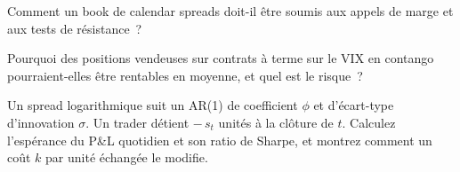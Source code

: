 \begin{interviewq}\label{iq:s1:calendar-spreads-and-curve-trades:4}
Comment un book de calendar spreads doit-il être soumis aux appels de marge et aux tests de résistance~?
\end{interviewq}

\begin{interviewq}\label{iq:s1:calendar-spreads-and-curve-trades:5}
Pourquoi des positions vendeuses sur contrats à terme sur le VIX en contango pourraient-elles être rentables en moyenne, et quel est le risque~?
\end{interviewq}

\begin{interviewq}\label{iq:s1:calendar-spreads-and-curve-trades:6}
Un spread logarithmique suit un AR(1) de coefficient $\phi$ et d'écart-type d'innovation $\sigma$. Un trader détient $-\,s_t$ unités à la clôture de $t$.
Calculez l'espérance du P\&L quotidien et son ratio de Sharpe, et montrez comment un coût $k$ par unité échangée le modifie.
\end{interviewq}
